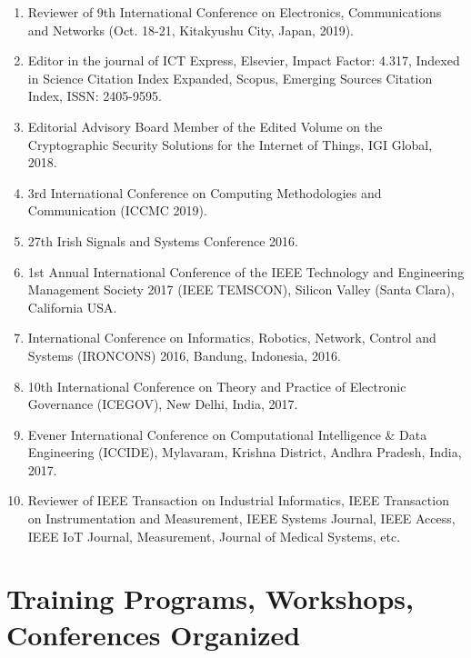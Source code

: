 \documentclass[11pt,a4paper]{moderncv}
\begin{document}
\begin{adjustwidth}{6em}{0pt}
\begin{enumerate}
		\item Reviewer of 9th International Conference on Electronics, Communications and Networks (Oct. 18-21, Kitakyushu City, Japan, 2019).
		
		\item Editor in the journal of ICT Express, Elsevier, Impact Factor: 4.317, Indexed in Science Citation Index Expanded, Scopus, Emerging Sources Citation Index, ISSN: 2405-9595.
		
		\item Editorial Advisory Board Member of the Edited Volume on the Cryptographic Security Solutions for the Internet of Things, IGI Global, 2018.
		
		\item 3rd International Conference on Computing Methodologies and Communication (ICCMC 2019).
		
		\item 27th Irish Signals and Systems Conference 2016.
		
		\item 1st Annual International Conference of the IEEE Technology and Engineering Management Society 2017 (IEEE TEMSCON), Silicon Valley (Santa Clara), California USA.
		
		\item International Conference on Informatics, Robotics, Network, Control and Systems (IRONCONS) 2016, Bandung, Indonesia, 2016.
		
		\item 10th International Conference on Theory and Practice of Electronic Governance (ICEGOV), New Delhi, India, 2017.
		
		\item Evener International Conference on Computational Intelligence \& Data Engineering (ICCIDE), Mylavaram, Krishna District, Andhra Pradesh, India, 2017.
		
		\item Reviewer of IEEE Transaction on Industrial Informatics, IEEE Transaction on Instrumentation and Measurement, IEEE Systems Journal, IEEE Access, IEEE IoT Journal, Measurement, Journal of Medical Systems, etc.
		

	\end{enumerate}
\end{adjustwidth}



\section{\textbf{Training Programs, Workshops, Conferences Organized}}
\end{document}

